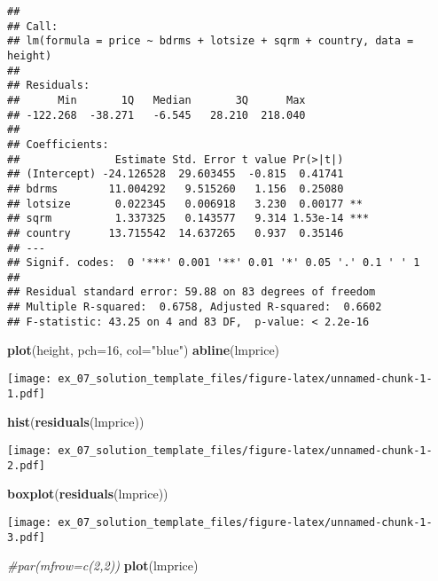 \documentclass[11pt,]{article}
\newenvironment{Shaded}{\begin{snugshade}}{\end{snugshade}}
\newcommand{\CommentTok}[1]{\textcolor[rgb]{0.56,0.35,0.01}{\textit{#1}}}
\newcommand{\DataTypeTok}[1]{\textcolor[rgb]{0.13,0.29,0.53}{#1}}
\newcommand{\DecValTok}[1]{\textcolor[rgb]{0.00,0.00,0.81}{#1}}
\newcommand{\KeywordTok}[1]{\textcolor[rgb]{0.13,0.29,0.53}{\textbf{#1}}}
\newcommand{\NormalTok}[1]{#1}
\newcommand{\StringTok}[1]{\textcolor[rgb]{0.31,0.60,0.02}{#1}}
\begin{document}
\begin{verbatim}
## 
## Call:
## lm(formula = price ~ bdrms + lotsize + sqrm + country, data = height)
## 
## Residuals:
##      Min       1Q   Median       3Q      Max 
## -122.268  -38.271   -6.545   28.210  218.040 
## 
## Coefficients:
##               Estimate Std. Error t value Pr(>|t|)    
## (Intercept) -24.126528  29.603455  -0.815  0.41741    
## bdrms        11.004292   9.515260   1.156  0.25080    
## lotsize       0.022345   0.006918   3.230  0.00177 ** 
## sqrm          1.337325   0.143577   9.314 1.53e-14 ***
## country      13.715542  14.637265   0.937  0.35146    
## ---
## Signif. codes:  0 '***' 0.001 '**' 0.01 '*' 0.05 '.' 0.1 ' ' 1
## 
## Residual standard error: 59.88 on 83 degrees of freedom
## Multiple R-squared:  0.6758, Adjusted R-squared:  0.6602 
## F-statistic: 43.25 on 4 and 83 DF,  p-value: < 2.2e-16
\end{verbatim}

\begin{Shaded}
\begin{Highlighting}[]
\KeywordTok{plot}\NormalTok{(height, }\DataTypeTok{pch=}\DecValTok{16}\NormalTok{, }\DataTypeTok{col=}\StringTok{"blue"}\NormalTok{)}
\KeywordTok{abline}\NormalTok{(lmprice)}
\end{Highlighting}
\end{Shaded}

\texttt{[image: ex\_07\_solution\_template\_files/figure-latex/unnamed-chunk-1-1.pdf]}

\begin{Shaded}
\begin{Highlighting}[]
\KeywordTok{hist}\NormalTok{(}\KeywordTok{residuals}\NormalTok{(lmprice))}
\end{Highlighting}
\end{Shaded}

\texttt{[image: ex\_07\_solution\_template\_files/figure-latex/unnamed-chunk-1-2.pdf]}

\begin{Shaded}
\begin{Highlighting}[]
\KeywordTok{boxplot}\NormalTok{(}\KeywordTok{residuals}\NormalTok{(lmprice))}
\end{Highlighting}
\end{Shaded}

\texttt{[image: ex\_07\_solution\_template\_files/figure-latex/unnamed-chunk-1-3.pdf]}

\begin{Shaded}
\begin{Highlighting}[]
\CommentTok{#par(mfrow=c(2,2))}
\KeywordTok{plot}\NormalTok{(lmprice)}
\end{Highlighting}
\end{Shaded}
\end{document}
